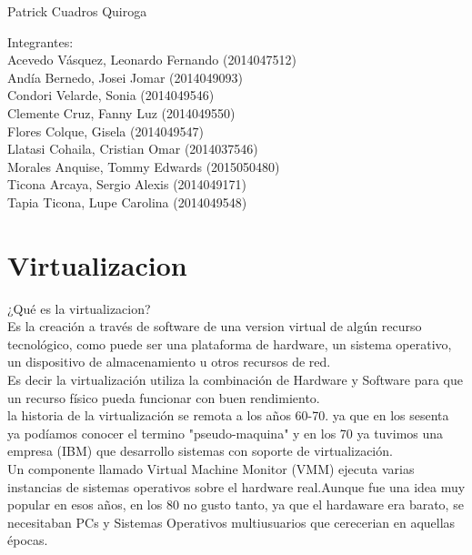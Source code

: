 \documentclass[12pt,letterpaper]{article}
\begin{document}
\begin{titlepage}
\begin{center}
\vspace*{0.1in}
\begin{large}
 Patrick Cuadros Quiroga\\
\end{large}

\vspace*{0.2in}
\vspace*{0.1in}
\begin{large}
Integrantes: \\
Acevedo Vásquez, Leonardo Fernando 	(2014047512) \\
Andía Bernedo, Josei Jomar 			(2014049093) \\
Condori Velarde, Sonia          	(2014049546) \\
Clemente Cruz, Fanny Luz    		(2014049550) \\
Flores Colque, Gisela           	(2014049547) \\
Llatasi Cohaila, Cristian Omar		(2014037546) \\
Morales Anquise, Tommy Edwards 		(2015050480) \\
Ticona Arcaya, Sergio Alexis		(2014049171) \\
Tapia Ticona, Lupe Carolina			(2014049548) \\
\end{large}
\end{center}

\end{titlepage}

  \tableofcontents
 \newpage


\section{Virtualizacion} 

¿Qué es la virtualizacion? \\
Es la creación a través de software de una version virtual de algún recurso tecnológico, como puede ser una plataforma de hardware, un sistema operativo, un dispositivo de almacenamiento u otros recursos de red.  \\

Es decir la virtualización utiliza la combinación de Hardware y Software para que un recurso físico pueda funcionar con buen rendimiento.  \\

la historia de la virtualización se remota a los años 60-70. ya que en los sesenta ya podíamos conocer el termino "pseudo-maquina" y en los 70 ya tuvimos una empresa (IBM) que desarrollo sistemas con soporte de virtualización. \\
Un componente llamado Virtual Machine Monitor (VMM) ejecuta varias instancias de sistemas operativos sobre el hardware real.Aunque fue una idea muy popular en esos años, en los 80 no gusto tanto, ya que el hardaware era barato, se necesitaban PCs y Sistemas Operativos multiusuarios que cerecerian en aquellas épocas.  \\ 
\end{document}
